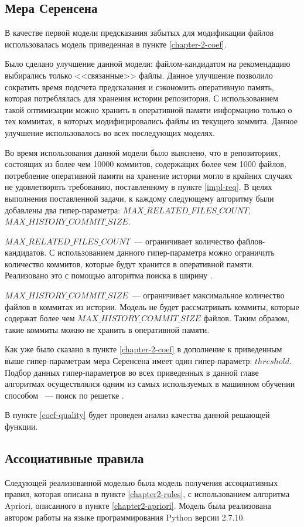     \subsection{Мера Серенсена}\label{chapter3-coef}
В качестве первой модели предсказания забытых для модификации файлов использовалась модель приведенная в пункте \ref{chapter-2-coef}. 

Было сделано улучшение данной модели: файлом-кандидатом на рекомендацию выбирались только <<связанные>> файлы. Данное улучшение позволило сократить время подсчета предсказания и сэкономить оперативную память, которая потреблялась для хранения истории репозитория. С использованием такой оптимизации можно хранить в оперативной памяти информацию только о тех коммитах, в которых модифицировались файлы из текущего коммита. Данное улучшение использовалось во всех последующих моделях.

Во время использования данной модели было выяснено, что в репозиториях, состоящих из более чем 10000 коммитов, содержащих более чем 1000 файлов, потребление оперативной памяти на хранение истории могло в крайних случаях не удовлетворять требованию, поставленному в пункте \ref{impl-req}. В целях выполнения поставленной задачи, к каждому следующему алгоритму были добавлены два гипер-параметра: $MAX\_RELATED\_FILES\_COUNT$, $MAX\_HISTORY\_COMMIT\_SIZE$. 

$MAX\_RELATED\_FILES\_COUNT$~--- ограничивает количество файлов-кандидатов. С использованием данного гипер-параметра можно ограничить количество коммитов, которые будут хранится в оперативной памяти. Реализовано это с помощью алгоритма поиска в ширину \cite{alghorithms}.

$MAX\_HISTORY\_COMMIT\_SIZE$~--- ограничивает максимальное количество файлов в коммитах из истории. Модель не будет рассматривать коммиты, которые содержат более чем $MAX\_HISTORY\_COMMIT\_SIZE$ файлов. Таким образом, такие коммиты можно не хранить в оперативной памяти.

Как уже было сказано в пункте \ref{chapter-2-coef} в дополнение к приведенным выше гипер-параметрам мера Серенсена имеет один гипер-параметр: $threshold$. Подбор данных гипер-параметров во всех приведенных в данной главе алгоритмах осуществлялся одним из самых используемых в машинном обучении способом ~--- поиск по решетке \cite{claesen2015hyperparameter}.

В пункте \ref{coef-quality} будет проведен анализ качества данной решающей функции.
    \subsection{Ассоциативные правила}
Следующей реализованной моделью была модель получения ассоциативных правил, которая описана в пункте \ref{chapter2-rules}, с использованием алгоритма Apriori, описанного в пункте \ref{chapter2-apriori}. Модель была реализована автором работы на языке программирования Python версии 2.7.10.

